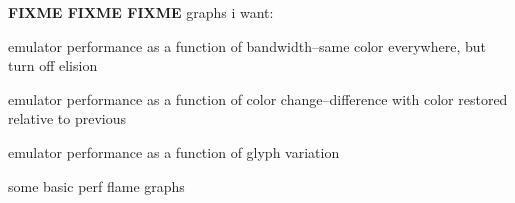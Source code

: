 \textbf{FIXME FIXME FIXME}
graphs i want:
\begin{denseitemize}
\item{emulator performance as a function of bandwidth--same color everywhere, but turn off elision}
\item{emulator performance as a function of color change--difference with color restored relative to previous}
\item{emulator performance as a function of glyph variation}
\item{some basic perf flame graphs}
\end{denseitemize}
